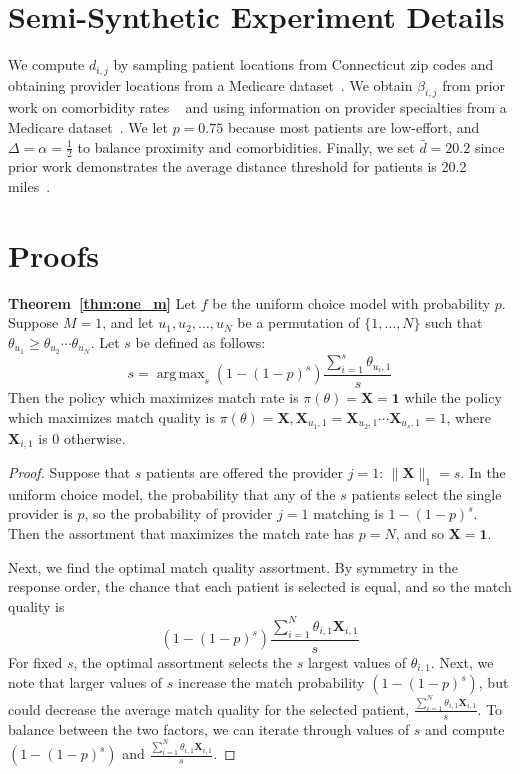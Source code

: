 \documentclass[11pt]{article}
\DeclareMathOperator*{\argmax}{arg\,max}
\begin{document}
\section{Semi-Synthetic Experiment Details}
\label{sec:semi_synthetic_details}
We compute $d_{i,j}$ by sampling patient locations from Connecticut zip codes and obtaining provider locations from a Medicare dataset~\citep{Medicare}. 
We obtain $\beta_{i,j}$ from prior work on comorbidity rates ~\citep{age_comorbidity} and using information on provider specialties from a Medicare dataset~\citep{Medicare}. 
We let $p=0.75$ because most patients are low-effort, and $\Delta=\alpha=\frac{1}{2}$ to balance proximity and comorbidities. Finally, we set $\bar{d}=20.2$ since prior work demonstrates the average distance threshold for patients is 20.2 miles~\citep{washington_distance}. 

\section{Proofs}
\label{sec:proofs}

\textbf{Theorem~\ref{thm:one_m}} Let $f$ be the uniform choice model with probability $p$.
Suppose $M=1$, and let $u_{1},u_{2},\ldots,u_{N}$ be a permutation of $\{1,\ldots,N\}$ such that $\theta_{u_{1}} \geq \theta_{u_{2}} \cdots \theta_{u_{N}}$.
Let $s$ be defined as follows:
\begin{equation}
   s = \argmax_{s} (1-(1-p)^{s}) \frac{\sum_{i=1}^{s} \theta_{u_{i},1}}{s}
\end{equation}
Then the policy which maximizes match rate is $\pi(\theta) = \mathbf{X} = \mathbf{1}$ while the policy which maximizes match quality is $\pi(\theta) =  \mathbf{X}, \mathbf{X}_{u_{1},1} = \mathbf{X}_{u_{2},1} \cdots \mathbf{X}_{u_{s},1} = 1$, where $\mathbf{X}_{i,1}$ is 0 otherwise. 

\begin{proof}

Suppose that $s$ patients are offered the provider $j=1$: $\lVert \mathbf{X} \rVert_{1} = s$. 
In the uniform choice model, the probability that any of the $s$ patients select the single provider is $p$, so the probability of provider $j=1$ matching is $1-(1-p)^{s}$. 
Then the assortment that maximizes the match rate has $p=N$, and so $\mathbf{X}=\mathbf{1}$. 

Next, we find the optimal match quality assortment. 
By symmetry in the response order, the chance that each patient is selected is equal, and so the match quality is 
\begin{equation}
    (1-(1-p)^{s}) \frac{\sum_{i=1}^{N} \theta_{i,1} \mathbf{X}_{i,1}}{s}
\end{equation}
For fixed $s$, the optimal assortment selects the $s$ largest values of $\theta_{i,1}$. 
Next, we note that larger values of $s$ increase the match probability $(1-(1-p)^{s})$, but could decrease the average match quality for the selected patient, $\frac{\sum_{i=1}^{N} \theta_{i,1} \mathbf{X}_{i,1}}{s}$. 
To balance between the two factors, we can iterate through values of $s$ and compute $(1-(1-p)^{s})$ and $\frac{\sum_{i=1}^{N} \theta_{i,1} \mathbf{X}_{i,1}}{s}$. 
\end{proof}
\end{document}
